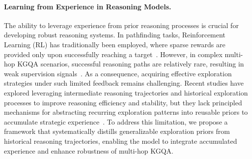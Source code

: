 \paragraph{Learning from Experience in Reasoning Models.} The ability to leverage experience from prior reasoning processes is crucial for developing robust reasoning systems. In pathfinding tasks, Reinforcement Learning (RL) has traditionally been employed, where sparse rewards are provided only upon successfully reaching a target~\citep{xiong2017deeppath,das2018go,wang2025evoagentx}. However, in complex multi-hop KGQA scenarios, successful reasoning paths are relatively rare, resulting in weak supervision signals~\cite{wang2025dynamically,zhang2025collaborative,liu2025sew}. As a consequence, acquiring effective exploration strategies under such limited feedback remains challenging. Recent studies have explored leveraging intermediate reasoning trajectories and historical exploration processes to improve reasoning efficiency and stability, but they lack principled mechanisms for abstracting recurring exploration patterns into reusable priors to accumulate strategic experience~\citep{wu2024self,pan2023automatically,huang2023large}. To address this limitation, we propose a framework that systematically distills generalizable exploration priors from historical reasoning trajectories, enabling the model to integrate accumulated experience and enhance robustness of multi-hop KGQA. 